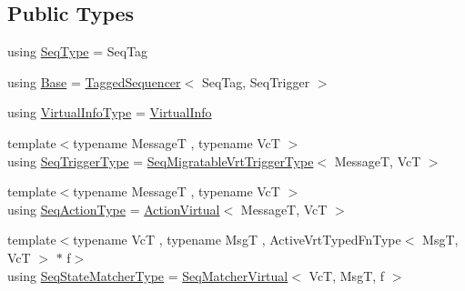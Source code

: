 \subsection*{Public Types}
\begin{DoxyCompactItemize}
\item 
using \hyperlink{structvt_1_1seq_1_1_tagged_sequencer_vrt_a254c920e4553310411a15c7d64c1b6c1}{Seq\+Type} = Seq\+Tag
\item 
using \hyperlink{structvt_1_1seq_1_1_tagged_sequencer_vrt_abef9929f24652d9ff758a98e44961263}{Base} = \hyperlink{structvt_1_1seq_1_1_tagged_sequencer}{Tagged\+Sequencer}$<$ Seq\+Tag, Seq\+Trigger $>$
\item 
using \hyperlink{structvt_1_1seq_1_1_tagged_sequencer_vrt_a19c5f10f5710fee8cd202735af8aa17f}{Virtual\+Info\+Type} = \hyperlink{structvt_1_1seq_1_1_virtual_info}{Virtual\+Info}
\item 
{\footnotesize template$<$typename MessageT , typename VcT $>$ }\\using \hyperlink{structvt_1_1seq_1_1_tagged_sequencer_vrt_a04f34e1c279e29fd32af152ccf8dcf99}{Seq\+Trigger\+Type} = \hyperlink{namespacevt_1_1seq_a4147691d837ca54f178a5f1c49effc6f}{Seq\+Migratable\+Vrt\+Trigger\+Type}$<$ MessageT, VcT $>$
\item 
{\footnotesize template$<$typename MessageT , typename VcT $>$ }\\using \hyperlink{structvt_1_1seq_1_1_tagged_sequencer_vrt_af7a8c4c1f5e352fb6d817b51fbf098d6}{Seq\+Action\+Type} = \hyperlink{structvt_1_1seq_1_1_action_virtual}{Action\+Virtual}$<$ MessageT, VcT $>$
\item 
{\footnotesize template$<$typename VcT , typename MsgT , Active\+Vrt\+Typed\+Fn\+Type$<$ Msg\+T, Vc\+T $>$ $\ast$ f$>$ }\\using \hyperlink{structvt_1_1seq_1_1_tagged_sequencer_vrt_a631ea1df2eb19c0058aaf29f93950226}{Seq\+State\+Matcher\+Type} = \hyperlink{structvt_1_1seq_1_1_seq_matcher_virtual}{Seq\+Matcher\+Virtual}$<$ VcT, MsgT, f $>$
\end{DoxyCompactItemize}
